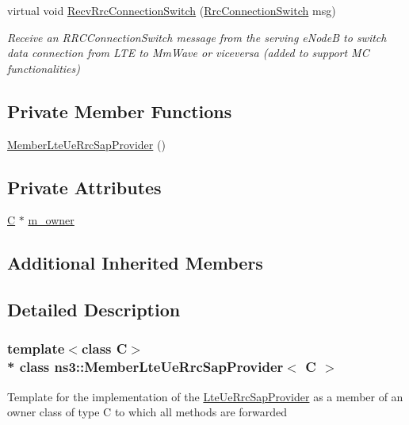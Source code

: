 \begin{DoxyCompactItemize}
virtual void \hyperlink{classns3_1_1MemberLteUeRrcSapProvider_a409f0defe96db7d07bd0883af36bda52}{Recv\+Rrc\+Connection\+Switch} (\hyperlink{structns3_1_1LteRrcSap_1_1RrcConnectionSwitch}{Rrc\+Connection\+Switch} msg)
\begin{DoxyCompactList}\small\item\em Receive an {\itshape R\+R\+C\+Connection\+Switch} message from the serving e\+NodeB to switch data connection from L\+TE to Mm\+Wave or viceversa (added to support MC functionalities) \end{DoxyCompactList}\end{DoxyCompactItemize}
\subsection*{Private Member Functions}
\begin{DoxyCompactItemize}
\item 
\hyperlink{classns3_1_1MemberLteUeRrcSapProvider_a3baef57289a174af0ca06fd3a9712b1f}{Member\+Lte\+Ue\+Rrc\+Sap\+Provider} ()
\end{DoxyCompactItemize}
\subsection*{Private Attributes}
\begin{DoxyCompactItemize}
\item 
\hyperlink{loss__COST231__small__cities__urban_8m_aaa53ca0b650dfd85c4f59fa156f7a2cc}{C} $\ast$ \hyperlink{classns3_1_1MemberLteUeRrcSapProvider_a6653ae762edde1378aa04bb43f04764a}{m\+\_\+owner}
\end{DoxyCompactItemize}
\subsection*{Additional Inherited Members}


\subsection{Detailed Description}
\subsubsection*{template$<$class C$>$\\*
class ns3\+::\+Member\+Lte\+Ue\+Rrc\+Sap\+Provider$<$ C $>$}

Template for the implementation of the \hyperlink{classns3_1_1LteUeRrcSapProvider}{Lte\+Ue\+Rrc\+Sap\+Provider} as a member of an owner class of type C to which all methods are forwarded 

